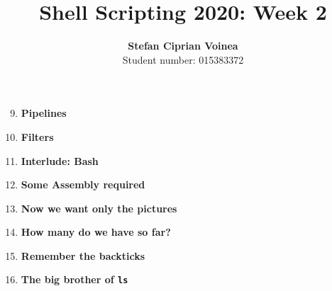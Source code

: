 \documentclass[9pt]{article}
\begin{document}
\title{Shell Scripting 2020: Week 2}
\author{\textbf{Stefan Ciprian Voinea}\\Student number: 015383372}
\maketitle


\begin{enumerate}
	
	\setcounter{enumi}{8}
	
	\item \textbf{Pipelines}
	
	\item \textbf{Filters}
	
	\item \textbf{Interlude: Bash}
	
	\item \textbf{Some Assembly required}
	
	\item \textbf{Now we want only the pictures}
	
	\item \textbf{How many do we have so far?}
	
	\item \textbf{Remember the backticks}
	
	\item \textbf{The big brother of \texttt{ls}}
	
\end{enumerate}
\end{document}
